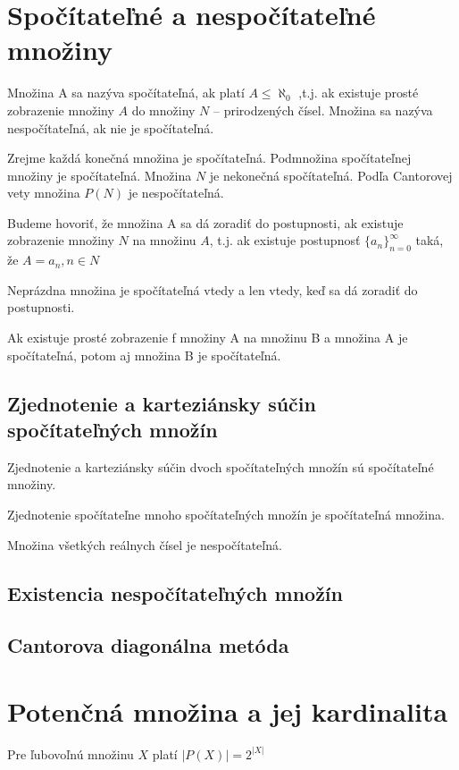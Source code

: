 \section {Spočítateľné a nespočítateľné množiny}

	Množina A sa nazýva spočítateľná, ak platí $A \leq \aleph_{0}$ ,t.j. ak existuje prosté zobrazenie množiny $A$ do množiny $N$ – prirodzených čísel. Množina sa nazýva nespočítateľná, ak nie je spočítateľná.

	Zrejme každá konečná množina je spočítateľná. Podmnožina spočítateľnej množiny je
	spočítateľná. Množina $N$ je nekonečná spočítateľná. Podľa Cantorovej vety množina $P(N)$ je
	nespočítateľná.

	Budeme hovoriť, že množina A sa dá zoradiť do postupnosti, ak existuje zobrazenie množiny $N$ na množinu $A$, t.j. ak existuje postupnosť $\{a_{n}\}_{n=0}^{\infty} $ taká, že $A={a_{n}, n \in N}$

	Neprázdna množina je spočítateľná vtedy a len vtedy, keď sa dá zoradiť do postupnosti.

	Ak existuje prosté zobrazenie f množiny A na množinu B a množina A je spočítateľná, potom aj množina B je spočítateľná.

	\subsection*{Zjednotenie a karteziánsky súčin spočítateľných množín}


	Zjednotenie a karteziánsky súčin dvoch spočítateľných množín sú spočítateľné množiny.

	Zjednotenie spočítateľne mnoho spočítateľných množín je spočítateľná množina.

	Množina všetkých reálnych čísel je nespočítateľná.


  	\subsection*{Existencia nespočítateľných množín}

	\subsection*{Cantorova diagonálna metóda}



\section {Potenčná množina a jej kardinalita}
	Pre ľubovoľnú množinu $X$ platí $|P (X)| = 2^{|X|}$
